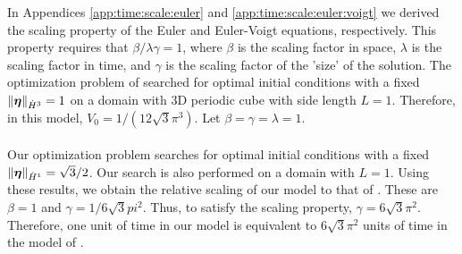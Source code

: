 {\noindent In Appendices \ref{app:time:scale:euler} and \ref{app:time:scale:euler:voigt} we derived the scaling property of the Euler and Euler-Voigt equations, respectively. This property requires that $\beta/\lambda\gamma = 1$, where $\beta$ is the scaling factor in space, $\lambda$ is the scaling factor in time, and $\gamma$ is the scaling factor of the 'size' of the solution. The optimization problem of \cite{zhao_systematic_2023} searched for optimal initial conditions with a fixed $\|{\boldsymbol \eta}\|_{\dot{H}^3} = 1$ on a domain with 3D periodic cube with side length $L=1$. Therefore, in this model, $V_0 = 1/(12\sqrt{3}\pi^3)$. Let $\beta=\gamma=\lambda = 1$.   
\\~\\
Our optimization problem searches for optimal initial conditions with a fixed $\|{\boldsymbol \eta}\|_{\dot{H}^1} = \sqrt{3}/2$. Our search is also performed on a domain with $L=1$. Using these results, we obtain the relative scaling of our model to that of \cite{zhao_systematic_2023}. These are $\beta = 1$ and $\gamma=1/6\sqrt{3}pi^2$. Thus, to satisfy the scaling property, $\gamma = 6\sqrt{3}\pi^2$. Therefore, one unit of time in our model is equivalent to $6\sqrt{3}\pi^2$ units of time in the model of \cite{zhao_systematic_2023}.


}

